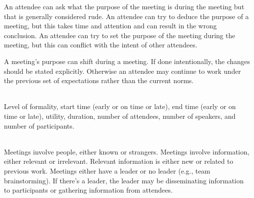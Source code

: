 An attendee can ask what the purpose of the meeting is during the meeting but that is generally considered rude. An attendee can try to deduce the purpose of a meeting, but this takes time and attention and can result in the wrong conclusion. An attendee can try to set the purpose of the meeting during the meeting, but this can conflict with the intent of other attendees. 

A meeting's purpose can shift during a meeting. If done intentionally, the changes should be stated explicitly. Otherwise an attendee may continue to work under the previous set of expectations rather than the current norms. 

\ \\


Level of formality, start time (early or on time or late), 
end time (early or on time or late), utility, 
duration, number of attendees, number of speakers, and number of participants.

\ \\


Meetings involve people, either known or strangers.
Meetings involve information, either relevant or irrelevant. Relevant information is either new or related to previous work.
Meetings either have a leader or no leader (e.g., team brainstorming). If there's a leader, the leader may be disseminating information to participants or gathering information from attendees.


